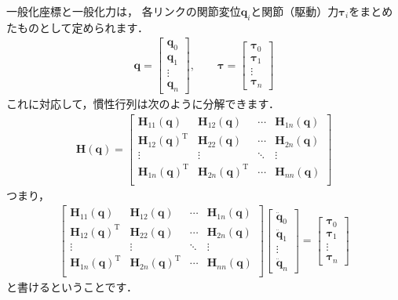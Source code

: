 \documentclass{jsarticle}
\begin{document}
一般化座標と一般化力は，
各リンクの関節変位$\bm{q}_{i}$と関節（駆動）力$\bm{\tau}_{i}$をまとめたものとして定められます．
\begin{align*}
\bm{q}=\left[\begin{array}{c}
\bm{q}_{0} \\
\bm{q}_{1} \\
\vdots \\
\bm{q}_{n}
\end{array}\right]
,\qquad
\bm{\tau}=\left[\begin{array}{c}
\bm{\tau}_{0} \\
\bm{\tau}_{1} \\
\vdots \\
\bm{\tau}_{n}
\end{array}\right]
\end{align*}
これに対応して，慣性行列は次のように分解できます．
\begin{align*}
\bm{H}(\bm{q})=\left[\begin{array}{cccc}
\bm{H}_{11}(\bm{q}) & \bm{H}_{12}(\bm{q}) & \cdots & \bm{H}_{1n}(\bm{q}) \\
\bm{H}_{12}(\bm{q})^{\mathrm{T}} & \bm{H}_{22}(\bm{q}) & \cdots & \bm{H}_{2n}(\bm{q}) \\
\vdots & \vdots & \ddots & \vdots \\
\bm{H}_{1n}(\bm{q})^{\mathrm{T}} & \bm{H}_{2n}(\bm{q})^{\mathrm{T}}& \cdots & \bm{H}_{nn}(\bm{q}) \\
\end{array}\right]
\end{align*}
つまり，
\begin{align*}
\left[\begin{array}{cccc}
\bm{H}_{11}(\bm{q}) & \bm{H}_{12}(\bm{q}) & \cdots & \bm{H}_{1n}(\bm{q}) \\
\bm{H}_{12}(\bm{q})^{\mathrm{T}} & \bm{H}_{22}(\bm{q}) & \cdots & \bm{H}_{2n}(\bm{q}) \\
\vdots & \vdots & \ddots & \vdots \\
\bm{H}_{1n}(\bm{q})^{\mathrm{T}} & \bm{H}_{2n}(\bm{q})^{\mathrm{T}}& \cdots & \bm{H}_{nn}(\bm{q}) \\
\end{array}\right]
\left[\begin{array}{c}
\ddot{\bm{q}}_{0} \\
\ddot{\bm{q}}_{1} \\
\vdots \\
\ddot{\bm{q}}_{n}
\end{array}\right]
=
\left[\begin{array}{c}
\bm{\tau}_{0} \\
\bm{\tau}_{1} \\
\vdots \\
\bm{\tau}_{n}
\end{array}\right]
\end{align*}
と書けるということです．
\end{document}
